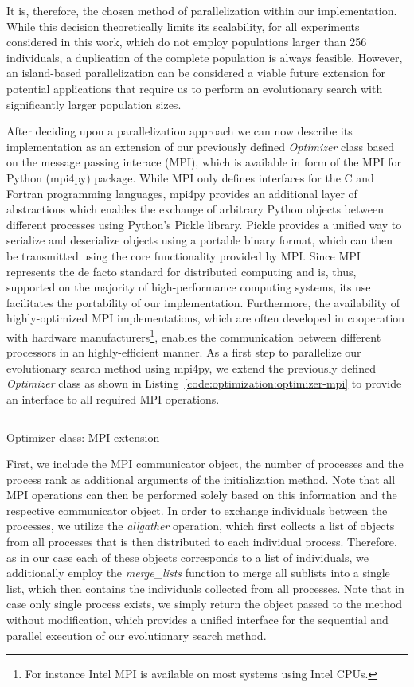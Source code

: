 It is, therefore, the chosen method of parallelization within our implementation.
While this decision theoretically limits its scalability, for all experiments considered in this work, which do not employ populations larger than 256 individuals, a duplication of the complete population is always feasible.
However, an island-based parallelization can be considered a viable future extension for potential applications that require us to perform an evolutionary search with significantly larger population sizes.

After deciding upon a parallelization approach we can now describe its implementation as an extension of our previously defined \emph{Optimizer} class based on the message passing interace (MPI), which is available in form of the MPI for Python (mpi4py) package.
While MPI only defines interfaces for the C and Fortran programming languages, mpi4py provides an additional layer of abstractions which enables the exchange of arbitrary Python objects between different processes using Python's Pickle library.
Pickle provides a unified way to serialize and deserialize objects using a portable binary format, which can then be transmitted using the core functionality provided by MPI.
Since MPI represents the de facto standard for distributed computing and is, thus, supported on the majority of high-performance computing systems, its use facilitates the portability of our implementation.
Furthermore, the availability of highly-optimized MPI implementations, which are often developed in cooperation with hardware manufacturers\footnote{For instance Intel MPI is available on most systems using Intel CPUs.}, enables the communication between different processors in an highly-efficient manner.
As a first step to parallelize our evolutionary search method using mpi4py, we extend the previously defined \emph{Optimizer} class as shown in Listing~\ref{code:optimization:optimizer-mpi} to provide an interface to all required MPI operations. 
\begin{listing}
	\inputminted[linenos]{python}{evostencils/optimization/optimizer_mpi.py}
	\caption{Optimizer class: MPI extension}
	\label{code:optimization:optimizer-mpi}
\end{listing}
First, we include the MPI communicator object, the number of processes and the process rank as additional arguments of the initialization method.
Note that all MPI operations can then be performed solely based on this information and the respective communicator object.
In order to exchange individuals between the processes, we utilize the \emph{allgather} operation, which first collects a list of objects from all processes that is then distributed to each individual process.
Therefore, as in our case each of these objects corresponds to a list of individuals, we additionally employ the \emph{merge\_lists} function to merge all sublists into a single list, which then contains the individuals collected from all processes.
Note that in case only single process exists, we simply return the object passed to the method without modification, which provides a unified interface for the sequential and parallel execution of our evolutionary search method.  

